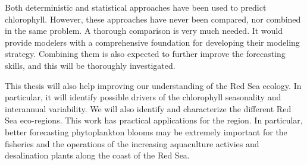 Both deterministic and statistical approaches have been used to
predict chlorophyll. However, these approaches have never been compared, nor
combined in the same problem. A thorough comparison is very much needed. It
would provide modelers with a comprehensive foundation for developing their
modeling strategy. Combining them is also expected to further improve the
forecasting skills, and this will be thoroughly investigated.

This thesis will also help improving our understanding of the Red Sea ecology.
In particular, it will identify possible drivers of the chlorophyll
seasonality and interannual variability. We will also identify and characterize
the different Red Sea eco-regions. This work has practical applications for the
region. In particular, better forecasting phytoplankton blooms may be extremely
important for the fisheries and the operations of the increasing aquaculture activies and desalination plants along the coast of the Red Sea.
